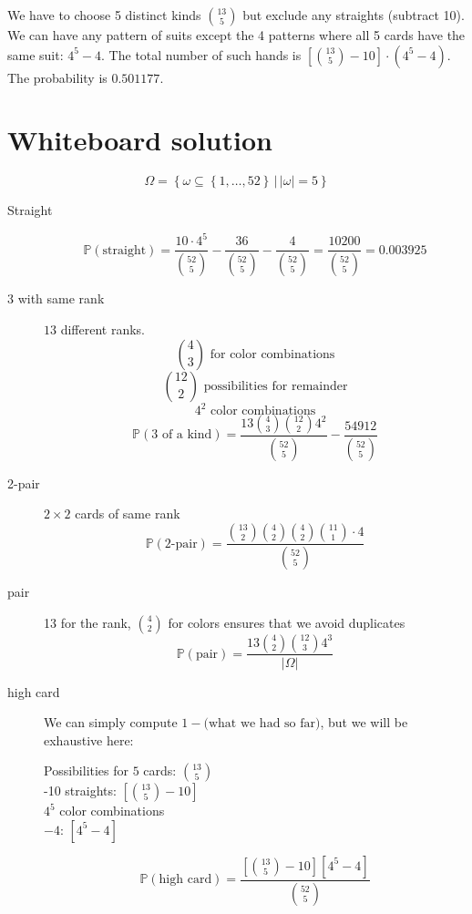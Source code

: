 \documentclass{article}
\newcommand\set[1]{\left\{#1\right\}}
\begin{document}
We have to choose 5 distinct kinds ${13 \choose 5}$ but exclude any straights (subtract 10). We can have any pattern of suits except the 4 patterns where all 5 cards have the same suit: $4^5-4$. The total number of such hands is $[{13 \choose 5}-10] \cdot (4^5-4)$. The probability is $0.501177$.

\section{Whiteboard solution}

\[ \Omega = \set{\omega \subseteq \set{1, \dots, 52}\,|\, |\omega| = 5} \]

\begin{description}
  \item[Straight]
    \[ \mathbb P(\text{straight}) = \frac{10 \cdot 4^5}{{52 \choose 5}} - \frac{36}{{52 \choose 5}} - \frac{4}{{52 \choose 5}} = \frac{10200}{{52 \choose 5}} = 0.003925 \]
  \item[3 with same rank] $13$ different ranks.
    \[ {4 \choose 3} \text{ for color combinations} \]
    \[ {12 \choose 2} \text{ possibilities for remainder} \]
    \[ 4^2 \text{ color combinations} \]
    \[ \mathbb P(\text{3 of a kind}) = \frac{13 {4 \choose 3} {12 \choose 2} 4^2}{{52 \choose 5}} - \frac{54912}{{52 \choose 5}} \]
  \item[2-pair] $2\times 2$ cards of same rank
    \[ \mathbb P(\text{2-pair}) = \frac{{13 \choose 2} {4 \choose 2} {4 \choose 2} {11 \choose 1} \cdot 4}{{52 \choose 5}} \]
  \item[pair]
    13 for the rank, ${4 \choose 2}$ for colors ensures that we avoid duplicates
    \[ \mathbb P(\text{pair}) = \frac{13 {4 \choose 2} {12 \choose 3} 4^3}{|\Omega|} \]
  \item[high card]
    We can simply compute $1 - \text{(what we had so far)}$, but we will be exhaustive here:

    Possibilities for $5$ cards: ${13 \choose 5}$ \\
    -10 straights: $[{13 \choose 5} - 10]$ \\
    $4^5$ color combinations \\
    $-4$: $[4^5 - 4]$

    \[ \mathbb P(\text{high card}) = \frac{[{13 \choose 5} - 10] [4^5 - 4]}{{52 \choose 5}} \]
\end{description}
\end{document}
